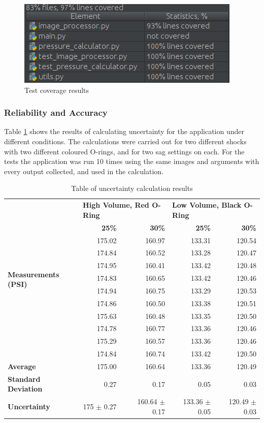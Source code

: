 			\begin{figure}[h!]
				\centering
				\includegraphics[scale=0.7]{../images/results/coverage.png}
				\caption{Test coverage results}
				\label{fig:coverage}
			\end{figure}
		\subsubsection{Reliability and Accuracy}
			Table \ref{tab:uncertainty} shows the results of calculating uncertainty for the application under different conditions. The calculations were carried out for two different shocks with two different coloured O-rings, and for two sag settings on each. For the tests the application was run 10 times using the same images and arguments with every output collected, and used in the calculation.
			\begin{table}[h!]
				\centering
				\caption{Table of uncertainty calculation results}
				\label{tab:uncertainty}
				\begin{tabular}{|l|r|r|r|r|}
					\hline
					\multirow{12}{7em}{\bfseries Measurements (PSI)}&\multicolumn{2}{|l|}{\bfseries High Volume, Red O-Ring}&\multicolumn{2}{|l|}{\bfseries Low Volume, Black O-Ring}\\
					\cline{2-5}&\bfseries 25\%&\bfseries 30\%&\bfseries 25\%&\bfseries 30\%\\
					\hline
					&175.02&160.97&133.31&120.54\\
					&174.84&160.52&133.28&120.47\\
					&174.95&160.41&133.42&120.48\\
					&174.83&160.65&133.42&120.46\\
					&174.94&160.75&133.29&120.53\\
					&174.86&160.50&133.38&120.51\\
					&175.63&160.48&133.35&120.50\\
					&174.78&160.77&133.36&120.46\\
					&175.29&160.57&133.36&120.46\\
					&174.84&160.74&133.42&120.50\\
					\hline
					\bfseries Average&175.00&160.64&133.36&120.49\\
					\bfseries Standard Deviation&0.27&0.17&0.05&0.03\\
					\bfseries Uncertainty&175 $\pm$ 0.27&160.64 $\pm$ 0.17&133.36 $\pm$ 0.05&120.49 $\pm$ 0.03\\
					\hline
				\end{tabular}
			\end{table}
